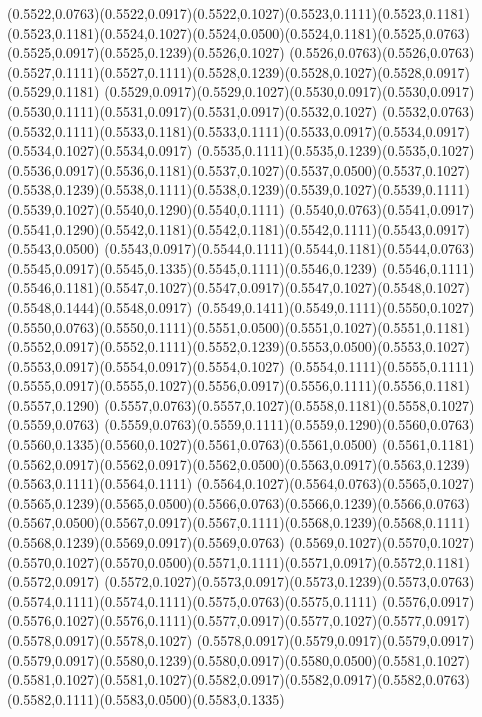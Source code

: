 (0.5522,0.0763)(0.5522,0.0917)(0.5522,0.1027)(0.5523,0.1111)(0.5523,0.1181)
\PST@Solid(0.5523,0.1181)(0.5524,0.1027)(0.5524,0.0500)(0.5524,0.1181)(0.5525,0.0763)(0.5525,0.0917)(0.5525,0.1239)(0.5526,0.1027)
(0.5526,0.0763)(0.5526,0.0763)(0.5527,0.1111)(0.5527,0.1111)(0.5528,0.1239)(0.5528,0.1027)(0.5528,0.0917)(0.5529,0.1181)
(0.5529,0.0917)(0.5529,0.1027)(0.5530,0.0917)(0.5530,0.0917)(0.5530,0.1111)(0.5531,0.0917)(0.5531,0.0917)(0.5532,0.1027)
(0.5532,0.0763)(0.5532,0.1111)(0.5533,0.1181)(0.5533,0.1111)(0.5533,0.0917)(0.5534,0.0917)(0.5534,0.1027)(0.5534,0.0917)
(0.5535,0.1111)(0.5535,0.1239)(0.5535,0.1027)(0.5536,0.0917)(0.5536,0.1181)(0.5537,0.1027)(0.5537,0.0500)(0.5537,0.1027)
(0.5538,0.1239)(0.5538,0.1111)(0.5538,0.1239)(0.5539,0.1027)(0.5539,0.1111)(0.5539,0.1027)(0.5540,0.1290)(0.5540,0.1111)
(0.5540,0.0763)(0.5541,0.0917)(0.5541,0.1290)(0.5542,0.1181)(0.5542,0.1181)(0.5542,0.1111)(0.5543,0.0917)(0.5543,0.0500)
(0.5543,0.0917)(0.5544,0.1111)(0.5544,0.1181)(0.5544,0.0763)(0.5545,0.0917)(0.5545,0.1335)(0.5545,0.1111)(0.5546,0.1239)
(0.5546,0.1111)(0.5546,0.1181)(0.5547,0.1027)(0.5547,0.0917)(0.5547,0.1027)(0.5548,0.1027)(0.5548,0.1444)(0.5548,0.0917)
(0.5549,0.1411)(0.5549,0.1111)(0.5550,0.1027)(0.5550,0.0763)(0.5550,0.1111)(0.5551,0.0500)(0.5551,0.1027)(0.5551,0.1181)
(0.5552,0.0917)(0.5552,0.1111)(0.5552,0.1239)(0.5553,0.0500)(0.5553,0.1027)(0.5553,0.0917)(0.5554,0.0917)(0.5554,0.1027)
(0.5554,0.1111)(0.5555,0.1111)(0.5555,0.0917)(0.5555,0.1027)(0.5556,0.0917)(0.5556,0.1111)(0.5556,0.1181)(0.5557,0.1290)
(0.5557,0.0763)(0.5557,0.1027)(0.5558,0.1181)(0.5558,0.1027)(0.5559,0.0763)
\PST@Solid(0.5559,0.0763)(0.5559,0.1111)(0.5559,0.1290)(0.5560,0.0763)(0.5560,0.1335)(0.5560,0.1027)(0.5561,0.0763)(0.5561,0.0500)
(0.5561,0.1181)(0.5562,0.0917)(0.5562,0.0917)(0.5562,0.0500)(0.5563,0.0917)(0.5563,0.1239)(0.5563,0.1111)(0.5564,0.1111)
(0.5564,0.1027)(0.5564,0.0763)(0.5565,0.1027)(0.5565,0.1239)(0.5565,0.0500)(0.5566,0.0763)(0.5566,0.1239)(0.5566,0.0763)
(0.5567,0.0500)(0.5567,0.0917)(0.5567,0.1111)(0.5568,0.1239)(0.5568,0.1111)(0.5568,0.1239)(0.5569,0.0917)(0.5569,0.0763)
(0.5569,0.1027)(0.5570,0.1027)(0.5570,0.1027)(0.5570,0.0500)(0.5571,0.1111)(0.5571,0.0917)(0.5572,0.1181)(0.5572,0.0917)
(0.5572,0.1027)(0.5573,0.0917)(0.5573,0.1239)(0.5573,0.0763)(0.5574,0.1111)(0.5574,0.1111)(0.5575,0.0763)(0.5575,0.1111)
(0.5576,0.0917)(0.5576,0.1027)(0.5576,0.1111)(0.5577,0.0917)(0.5577,0.1027)(0.5577,0.0917)(0.5578,0.0917)(0.5578,0.1027)
(0.5578,0.0917)(0.5579,0.0917)(0.5579,0.0917)(0.5579,0.0917)(0.5580,0.1239)(0.5580,0.0917)(0.5580,0.0500)(0.5581,0.1027)
(0.5581,0.1027)(0.5581,0.1027)(0.5582,0.0917)(0.5582,0.0917)(0.5582,0.0763)(0.5582,0.1111)(0.5583,0.0500)(0.5583,0.1335)
